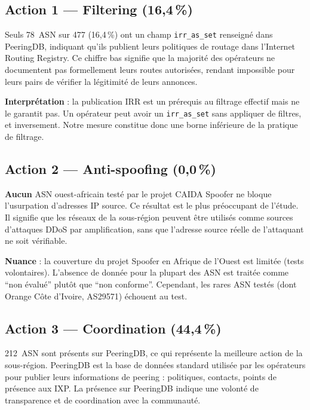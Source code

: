 \documentclass{eneam}
\begin{document}
\subsection{Action 1 --- Filtering (16,4\,\%)}

Seuls 78~ASN sur 477 (16,4\,\%) ont un champ \texttt{irr\_as\_set} renseigné dans PeeringDB, indiquant qu'ils publient leurs politiques de routage dans l'Internet Routing Registry. Ce chiffre bas signifie que la majorité des opérateurs ne documentent pas formellement leurs routes autorisées, rendant impossible pour leurs pairs de vérifier la légitimité de leurs annonces.

\textbf{Interprétation} : la publication IRR est un prérequis au filtrage effectif mais ne le garantit pas. Un opérateur peut avoir un \texttt{irr\_as\_set} sans appliquer de filtres, et inversement. Notre mesure constitue donc une borne inférieure de la pratique de filtrage.

\subsection{Action 2 --- Anti-spoofing (0,0\,\%)}

\textbf{Aucun} ASN ouest-africain testé par le projet CAIDA Spoofer ne bloque l'usurpation d'adresses IP source. Ce résultat est le plus préoccupant de l'étude. Il signifie que les réseaux de la sous-région peuvent être utilisés comme sources d'attaques DDoS par amplification, sans que l'adresse source réelle de l'attaquant ne soit vérifiable.

\textbf{Nuance} : la couverture du projet Spoofer en Afrique de l'Ouest est limitée (tests volontaires). L'absence de donnée pour la plupart des ASN est traitée comme ``non évalué'' plutôt que ``non conforme''. Cependant, les rares ASN testés (dont Orange Côte d'Ivoire, AS29571) échouent au test.

\subsection{Action 3 --- Coordination (44,4\,\%)}

212~ASN sont présents sur PeeringDB, ce qui représente la meilleure action de la sous-région. PeeringDB est la base de données standard utilisée par les opérateurs pour publier leurs informations de peering : politiques, contacts, points de présence aux IXP. La présence sur PeeringDB indique une volonté de transparence et de coordination avec la communauté.
\end{document}
